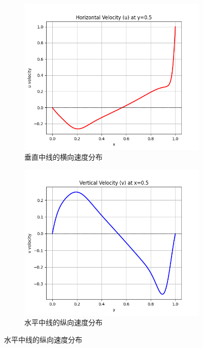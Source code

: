 \documentclass[12pt, a4paper]{article}
\begin{document}
\begin{figure}[htbp]
    \centering
    \begin{subfigure}[b]{0.48\textwidth}
        \includegraphics[width=\textwidth]{pictures/u_at_y_m.png}
        \caption{垂直中线的横向速度分布}
    \end{subfigure}
    \hfill
    \begin{subfigure}[b]{0.48\textwidth}
        \includegraphics[width=\textwidth]{pictures/v_at_x_m.png}
        \caption{水平中线的纵向速度分布}
        \label{fig:sub2}
    \end{subfigure}
\end{figure}
\end{document}
